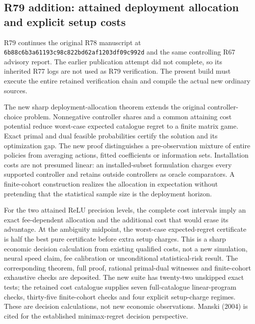 \hypertarget{r79-addition-attained-deployment-allocation-and-explicit-setup-costs}{%
\subsection{R79 addition: attained deployment allocation and explicit
setup
costs}\label{r79-addition-attained-deployment-allocation-and-explicit-setup-costs}}

R79 continues the original R78 manuscript at
\texttt{6b88c6b3a61193c98c822bd62af1203df09c992d} and the same
controlling R67 advisory report. The earlier publication attempt did not
complete, so its inherited R77 logs are not used as R79 verification.
The present build must execute the entire retained verification chain
and compile the actual new ordinary sources.

The new sharp deployment-allocation theorem extends the original
controller-choice problem. Nonnegative controller shares and a common
attaining cost potential reduce worst-case expected catalogue regret to
a finite matrix game. Exact primal and dual feasible probabilities
certify the solution and its optimization gap. The new proof
distinguishes a pre-observation mixture of entire policies from
averaging actions, fitted coefficients or information sets. Installation
costs are not presumed linear: an installed-subset formulation charges
every supported controller and retains outside controllers as oracle
comparators. A finite-cohort construction realizes the allocation in
expectation without pretending that the statistical sample size is the
deployment horizon.

For the two attained ReLU precision levels, the complete cost intervals
imply an exact fee-dependent allocation and the additional cost that
would erase its advantage. At the ambiguity midpoint, the worst-case
expected-regret certificate is half the best pure certificate before
extra setup charges. This is a sharp economic decision calculation from
existing qualified costs, not a new simulation, neural speed claim, fee
calibration or unconditional statistical-risk result. The corresponding
theorem, full proof, rational primal-dual witnesses and finite-cohort
exhaustive checks are deposited. The new suite has twenty-two unskipped
exact tests; the retained cost catalogue supplies seven full-catalogue
linear-program checks, thirty-five finite-cohort checks and four
explicit setup-charge regimes. These are decision calculations, not new
economic observations. Manski (2004) is cited for the established
minimax-regret decision perspective.

